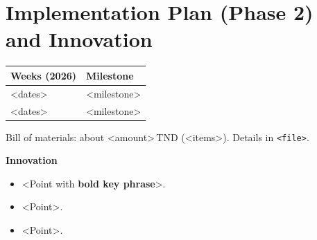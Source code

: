 \documentclass[10pt,a4paper]{article}
\newcommand{\tablesize}{\footnotesize}                 %
\begin{document}
\section{Implementation Plan (Phase 2) and Innovation}
\begin{minipage}[t]{0.55\linewidth}\vspace{0pt}
{\tablesize
\begin{tabular}{@{}ll@{}}
\toprule
Weeks (2026) & Milestone\\\midrule
<dates> & <milestone>\\
<dates> & <milestone>\\
\bottomrule
\end{tabular}}

\smallskip
Bill of materials: about <amount>\,TND (<items>). Details in \texttt{<file>}.
\end{minipage}\hfill
\begin{minipage}[t]{0.42\linewidth}\vspace{0pt}
\textbf{Innovation}
\begin{itemize}
\item <Point with \textbf{bold key phrase}>.
\item <Point>.
\item <Point>.
\end{itemize}
\end{minipage}
\end{document}
